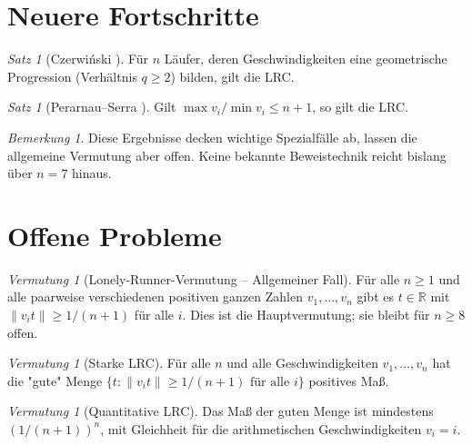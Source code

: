 \documentclass[12pt,a4paper]{amsart}
\theoremstyle{definition}
\theoremstyle{remark}
\newtheorem{satz}[theorem]{Satz}
\newtheorem{vermutung}[theorem]{Vermutung}
\newtheorem{bemerkung}[theorem]{Bemerkung}
\newcommand{\R}{\mathbb{R}}
\begin{document}
\section{Neuere Fortschritte}\label{sec:fortschritte}

\begin{satz}[Czerwiński \cite{Czerwinski2012}]\label{satz:czerwinski}
Für $n$ Läufer, deren Geschwindigkeiten eine geometrische Progression
(Verhältnis $q \geq 2$) bilden, gilt die LRC.
\end{satz}

\begin{satz}[Perarnau--Serra \cite{PerarnauSerra2016}]\label{satz:perarnau}
Gilt $\max v_i / \min v_i \leq n+1$, so gilt die LRC.
\end{satz}

\begin{bemerkung}
Diese Ergebnisse decken wichtige Spezialfälle ab, lassen die allgemeine Vermutung
aber offen. Keine bekannte Beweistechnik reicht bislang über $n = 7$ hinaus.
\end{bemerkung}

\section{Offene Probleme}\label{sec:offen}

\begin{vermutung}[Lonely-Runner-Vermutung -- Allgemeiner Fall]\label{verm:lrc_allg}
Für alle $n \geq 1$ und alle paarweise verschiedenen positiven ganzen Zahlen
$v_1, \ldots, v_n$ gibt es $t \in \R$ mit $\|v_i t\| \geq 1/(n+1)$ für alle $i$.
Dies ist die Hauptvermutung; sie bleibt für $n \geq 8$ offen.
\end{vermutung}

\begin{vermutung}[Starke LRC]\label{verm:starke_lrc}
Für alle $n$ und alle Geschwindigkeiten $v_1, \ldots, v_n$ hat die "gute" Menge
$\{t : \|v_i t\| \geq 1/(n+1) \text{ für alle } i\}$ positives Maß.
\end{vermutung}

\begin{vermutung}[Quantitative LRC]\label{verm:quant_lrc}
Das Maß der guten Menge ist mindestens $(1/(n+1))^n$, mit Gleichheit für die
arithmetischen Geschwindigkeiten $v_i = i$.
\end{vermutung}
\end{document}
